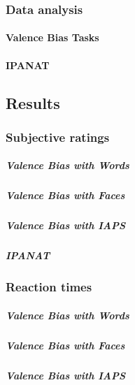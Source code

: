 \documentclass[man]{apa6}
\let\oldparagraph\paragraph
\renewcommand{\paragraph}[1]{\oldparagraph{#1}\mbox{}}
\let\oldsubparagraph\subparagraph
\renewcommand{\subparagraph}[1]{\oldsubparagraph{#1}\mbox{}}
\begin{document}
\hypertarget{data-analysis-1}{%
\subsubsection{Data analysis}\label{data-analysis-1}}

\hypertarget{valence-bias-tasks-1}{%
\paragraph{Valence Bias Tasks}\label{valence-bias-tasks-1}}

\hypertarget{ipanat-2}{%
\paragraph{IPANAT}\label{ipanat-2}}

\hypertarget{results-1}{%
\subsection{Results}\label{results-1}}

\hypertarget{subjective-ratings-1}{%
\subsubsection{Subjective ratings}\label{subjective-ratings-1}}

\hypertarget{valence-bias-with-words-1}{%
\subparagraph{Valence Bias with Words}\label{valence-bias-with-words-1}}

\hypertarget{valence-bias-with-faces-1}{%
\subparagraph{Valence Bias with Faces}\label{valence-bias-with-faces-1}}

\hypertarget{valence-bias-with-iaps-1}{%
\subparagraph{Valence Bias with IAPS}\label{valence-bias-with-iaps-1}}

\hypertarget{ipanat-3}{%
\subparagraph{IPANAT}\label{ipanat-3}}

\hypertarget{reaction-times-1}{%
\subsubsection{Reaction times}\label{reaction-times-1}}

\hypertarget{valence-bias-with-words-2}{%
\subparagraph{Valence Bias with Words}\label{valence-bias-with-words-2}}

\hypertarget{valence-bias-with-faces-2}{%
\subparagraph{Valence Bias with Faces}\label{valence-bias-with-faces-2}}

\hypertarget{valence-bias-with-iaps-2}{%
\subparagraph{Valence Bias with IAPS}\label{valence-bias-with-iaps-2}}
\end{document}

